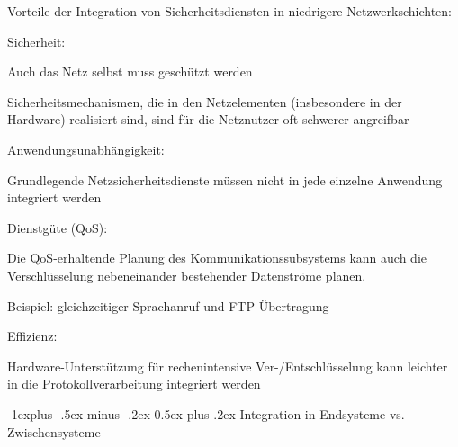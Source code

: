 \documentclass[a4paper]{article}
\makeatletter
\renewcommand{\subsection}{\@startsection{subsection}{2}{0mm}%
 {-1explus -.5ex minus -.2ex}%
 {0.5ex plus .2ex}%
 {\normalfont\normalsize\bfseries}}
\makeatother
\begin{document}
\begin{multicols}{3}
      \begin{itemize*}
            \item Vorteile der Integration von Sicherheitsdiensten in niedrigere
            Netzwerkschichten:
            \begin{itemize*}
                  \item Sicherheit:
                  \begin{itemize*} \item Auch das Netz selbst muss geschützt werden \item Sicherheitsmechanismen, die in den Netzelementen (insbesondere in der Hardware) realisiert sind, sind für die Netznutzer oft schwerer angreifbar \end{itemize*}
                  \item Anwendungsunabhängigkeit:
                  \begin{itemize*} \item Grundlegende Netzsicherheitsdienste müssen nicht in jede einzelne Anwendung integriert werden \end{itemize*}
                  \item Dienstgüte (QoS):
                  \begin{itemize*} \item Die QoS-erhaltende Planung des Kommunikationssubsystems kann auch die Verschlüsselung nebeneinander bestehender Datenströme planen. \item Beispiel: gleichzeitiger Sprachanruf und FTP-Übertragung \end{itemize*}
                  \item Effizienz:
                  \begin{itemize*} \item Hardware-Unterstützung für rechenintensive Ver-/Entschlüsselung kann leichter in die Protokollverarbeitung integriert werden \end{itemize*}
            \end{itemize*}
      \end{itemize*}


      \subsection{Integration in Endsysteme vs.
            Zwischensysteme}


\end{multicols}
\end{document}
